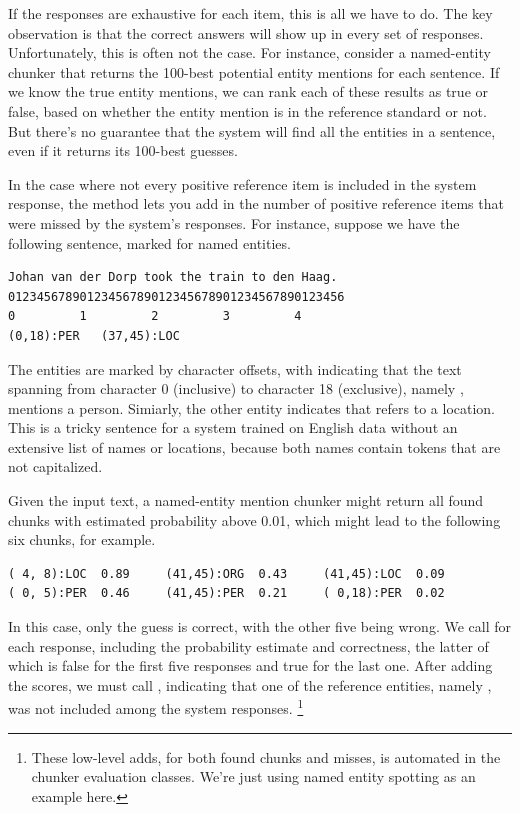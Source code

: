 If the responses are exhaustive for each item, this is all we have to
do.  The key observation is that the correct answers will show up in
every set of responses.  Unfortunately, this is often not the case.
For instance, consider a named-entity chunker that returns the
100-best potential entity mentions for each sentence.  If we know the
true entity mentions, we can rank each of these results as true or
false, based on whether the entity mention is in the reference
standard or not.  But there's no guarantee that the system will find
all the entities in a sentence, even if it returns its 100-best
guesses.

In the case where not every positive reference item is included in the
system response, the method  lets you add in the
number of positive reference items that were missed by the system's
responses.  For instance, suppose we have the following sentence, marked
for named entities.
%
\begin{verbatim}
Johan van der Dorp took the train to den Haag.
01234567890123456789012345678901234567890123456
0         1         2         3         4
(0,18):PER   (37,45):LOC
\end{verbatim}
%
The entities are marked by character offsets, with 
indicating that the text spanning from character 0 (inclusive) to
character 18 (exclusive), namely ,
mentions a person.  Simiarly, the other entity indicates that
 refers to a location.  This is a tricky
sentence for a system trained on English data without an extensive
list of names or locations, because both names contain tokens that are
not capitalized.  

Given the input text, a named-entity mention chunker might return all
found chunks with estimated probability above 0.01, which might lead
to the following six chunks, for example.
%
\begin{verbatim}
( 4, 8):LOC  0.89     (41,45):ORG  0.43     (41,45):LOC  0.09
( 0, 5):PER  0.46     (41,45):PER  0.21     ( 0,18):PER  0.02
\end{verbatim}
%
In this case, only the guess  is correct, with the
other five being wrong.  We call  for each response,
including the probability estimate and correctness, the latter of
which is false for the first five responses and true for the last one.
After adding the scores, we must call , indicating
that one of the reference entities, namely , was not
included among the system responses.%
%
\footnote{These low-level adds, for both found chunks and misses, is
  automated in the chunker evaluation classes.  We're just using named
  entity spotting as an example here.}

